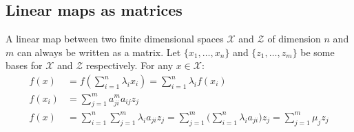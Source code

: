 	\subsection{Linear maps as matrices}
	A linear map between two finite dimensional spaces $\mathcal{X}$ and $\mathcal{Z}$ of dimension $n$ and $m$ can always be written as a matrix.
	Let $\{x_1, \dots, x_n\}$ and $\{z_1, \dots, z_m\}$ be some bases for $\mathcal{X}$ and $\mathcal{Z}$ respectively.
	For any $x\in\mathcal{X}$:
	\begin{align*}
		f(x) &= f(\sum\limits_{i=1}^n\lambda_ix_i) = \sum\limits_{i = 1}^n\lambda_if(x_i)\\
		f(x_i) &= \sum\limits_{j=1}^ma_{ji}^ma_{ij}z_j\\
		f(x) &= \sum\limits_{i=1}^n\sum\limits_{j=1}^m\lambda_ia_{ji}z_j = \sum\limits_{j=1}^m\bigl(\sum\limits_{i=1}^n\lambda_ia_{ji}\bigr)z_j = \sum\limits_{j=1}^m\mu_j z_j
	\end{align*}
